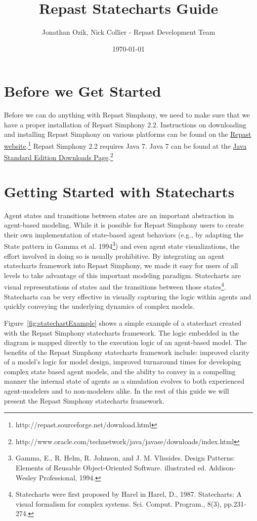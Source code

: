 \documentclass[11pt]{amsart}
\title{Repast Statecharts Guide}
\author{Jonathan Ozik, Nick Collier - Repast Development Team}
\date{\today}                                           %
\begin{document}
 
\maketitle
\setcounter{section}{-1}

\section{Before we Get Started}
Before we can do anything with Repast Simphony, we need to make sure that we have a proper installation of Repast Simphony 2.2. Instructions on downloading and installing Repast Simphony on various platforms can be found on the \href{http://repast.sourceforge.net/download.html}{Repast website}.\footnote{http://repast.sourceforge.net/download.html} Repast Simphony 2.2 requires Java 7. Java 7 can be found at the \href{http://www.oracle.com/technetwork/java/javase/downloads/index.html}{Java Standard Edition Downloads Page}.\footnote{http://www.oracle.com/technetwork/java/javase/downloads/index.html}


\section{Getting Started with Statecharts}

Agent states and transitions between states are an important abstraction in agent-based modeling. While it is possible for Repast Simphony users to create their own implementation of state-based agent behaviors (e.g., by adapting the State pattern in Gamma et al. 1994\footnote{Gamma, E., R. Helm, R. Johnson, and J. M. Vlissides. Design Patterns: Elements of Reusable Object-Oriented Software. illustrated ed. Addison-Wesley Professional, 1994.}) and even agent state visualizations, the effort involved in doing so is usually prohibitive. By integrating an agent statecharts framework into Repast Simphony, we made it easy for users of all levels to take advantage of this important modeling paradigm. Statecharts are visual representations of states and the transitions between those states\footnote{Statecharts were first proposed by Harel in Harel, D., 1987. Statecharts: A visual formalism for complex systems. Sci. Comput. Program., 8(3), pp.231-274.}. Statecharts can be very effective in visually capturing the logic within agents and quickly conveying the underlying dynamics of complex models.

Figure~\ref{fig:statechartExample} shows a simple example of a statechart created with the Repast Simphony statecharts framework. The logic embedded in the diagram is mapped directly to the execution logic of an agent-based model. The benefits of the Repast Simphony statecharts framework include: improved clarity of a model's logic for model design, improved turnaround times for developing complex state based agent models, and the ability to convey in a compelling manner the internal state of agents as a simulation evolves to both experienced agent-modelers and to non-modelers alike. In the rest of this guide we will present the Repast Simphony statecharts framework.
\end{document}

